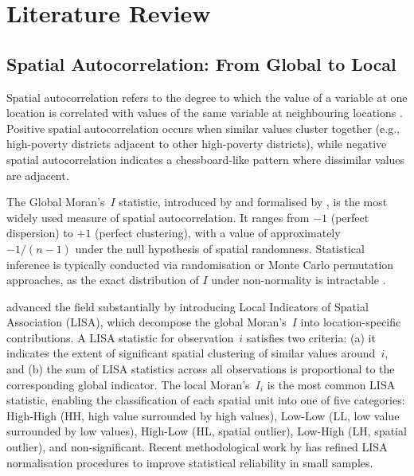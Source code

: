 \documentclass[12pt,a4paper,twoside]{article}
\begin{document}
\section{Literature Review}

\subsection{Spatial Autocorrelation: From Global to Local}

Spatial autocorrelation refers to the degree to which the value of a variable at
one location is correlated with values of the same variable at neighbouring
locations \citep{moran1950}. Positive spatial autocorrelation occurs when similar
values cluster together (e.g., high-poverty districts adjacent to other high-poverty
districts), while negative spatial autocorrelation indicates a chessboard-like
pattern where dissimilar values are adjacent.

The Global Moran's~$I$ statistic, introduced by \citet{moran1950} and formalised
by \citet{cliff1973}, is the most widely used measure of spatial autocorrelation.
It ranges from $-1$ (perfect dispersion) to $+1$ (perfect clustering), with a value
of approximately $-1/(n-1)$ under the null hypothesis of spatial randomness.
Statistical inference is typically conducted via randomisation or Monte Carlo
permutation approaches, as the exact distribution of $I$ under non-normality is
intractable \citep{anselin1995lisa}.

\citet{anselin1995lisa} advanced the field substantially by introducing Local
Indicators of Spatial Association (LISA), which decompose the global Moran's~$I$
into location-specific contributions. A LISA statistic for observation~$i$ satisfies
two criteria: (a) it indicates the extent of significant spatial clustering of
similar values around~$i$, and (b) the sum of LISA statistics across all
observations is proportional to the corresponding global indicator. The local
Moran's~$I_i$ is the most common LISA statistic, enabling the classification of
each spatial unit into one of five categories: High-High (HH, high value surrounded
by high values), Low-Low (LL, low value surrounded by low values), High-Low (HL,
spatial outlier), Low-High (LH, spatial outlier), and non-significant. Recent
methodological work by \citet{chen2022reconstruction} has refined LISA
normalisation procedures to improve statistical reliability in small samples.
\end{document}
